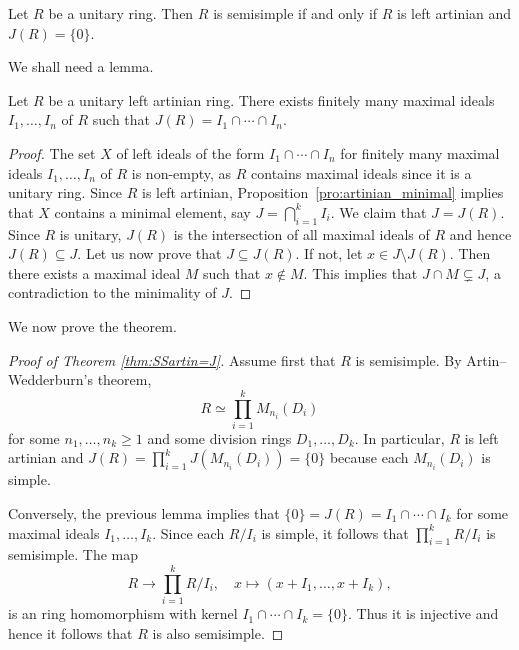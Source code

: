 \begin{theorem}
	\label{thm:SSartin=J}
	Let $R$ be a unitary ring. Then $R$ is semisimple if and only if 
	$R$ is left artinian and $J(R)=\{0\}$.
\end{theorem}

We shall need a lemma.

\begin{lemma}
	\label{lem:Jartiniano}
	Let $R$ be a unitary left artinian ring. There exists finitely many maximal ideals 
	$I_1,\dots,I_n$ of $R$ such that 
	$J(R)=I_1\cap\cdots\cap I_n$.
\end{lemma}

\begin{proof}
    The set $X$ of left ideals of the form
	$I_1\cap\cdots\cap I_n$ for finitely many maximal ideals $I_1,\dots,I_n$ of $R$
	is non-empty, as $R$ contains maximal ideals since it is a unitary ring. 
    Since $R$ is left artinian,
	Proposition~\ref{pro:artinian_minimal} implies that $X$ 
	contains a minimal element, say 
	$J=\bigcap_{i=1}^k I_i$. We claim that $J=J(R)$. 
	Since $R$ is
	unitary, $J(R)$ is the intersection of all maximal ideals of $R$ and hence 
	$J(R)\subseteq J$. Let us now prove that $J\subseteq J(R)$. 
	If not, let $x\in
	J\setminus J(R)$. Then there exists a maximal ideal $M$ such that $x\not\in
	M$. This implies that $J\cap M\subsetneq J$, a contradiction to the minimality of 
    $J$. 
\end{proof}

We now prove the theorem. 

\begin{proof}[Proof of Theorem \ref{thm:SSartin=J}]
	Assume first that $R$ is semisimple. By Artin--Wedderburn's theorem, 
	\[
		R\simeq\prod_{i=1}^kM_{n_i}(D_i)
	\]
	for some $n_1,\dots,n_k\geq1$ and some division rings $D_1,\dots,D_k$. 
	In particular, $R$ is left artinian and $J(R)=\prod_{i=1}^kJ(M_{n_i}(D_i))=\{0\}$
	because each $M_{n_i}(D_i)$ is simple. 

    Conversely, the previous lemma implies that $\{0\}=J(R)=I_1\cap\cdots\cap I_k$ for some
    maximal ideals $I_1,\dots,I_k$. Since each $R/I_i$ is simple, it follows that 
    $\prod_{i=1}^k R/I_i$ is semisimple. The map 
	\[
	R\to \prod_{i=1}^k R/I_i,\quad
	x\mapsto (x+I_1,\dots,x+I_k),
	\]
	is an ring homomorphism with 
	kernel $I_1\cap\cdots\cap I_k=\{0\}$. Thus it is injective and hence 
	it follows that $R$ 
	is also semisimple. 
\end{proof}



